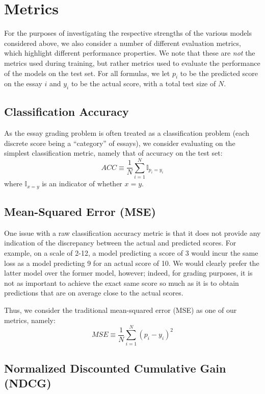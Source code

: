 \documentclass[10pt,psamsfonts]{amsart}
\theoremstyle{definition}
\theoremstyle{remark}
\numberwithin{equation}{section}
\begin{document}
\section*{Metrics}

For the purposes of investigating the respective strengths of the various models considered above, we also consider a number of different evaluation metrics, which highlight different performance properties. We note that these are {\em not} the metrics used during training, but rather metrics used to evaluate the performance of the models on the test set. For all formulas, we let $p_i$ to be the predicted score on the essay $i$ and $y_i$ to be the actual score, with a total test size of $N$.

\subsection*{Classification Accuracy}

As the essay grading problem is often treated as a classification problem (each discrete score being a ``category'' of essays), we consider evaluating on the simplest classification metric, namely that of accuracy on the test set:
$$ACC \equiv \frac{1}{N} \sum_{i=1}^N \mathbb{I}_{p_i = y_i}$$
where $\mathbb{I}_{x=y}$ is an indicator of whether $x=y$.

\subsection*{Mean-Squared Error (MSE)}

One issue with a raw classification accuracy metric is that it does not provide any indication of the discrepancy between the actual and predicted scores. For example, on a scale of 2-12, a model predicting a score of 3 would incur the same loss as a model predicting 9 for an actual score of 10. We would clearly prefer the latter model over the former model, however; indeed, for grading purposes, it is not as important to achieve the exact same score so much as it is to obtain predictions that are on average close to the actual scores.

Thus, we consider the traditional mean-squared error (MSE) as one of our metrics, namely:
$$MSE \equiv \frac{1}{N} \sum_{i=1}^N (p_i - y_i)^2$$

\subsection*{Normalized Discounted Cumulative Gain (NDCG)}
\end{document}
